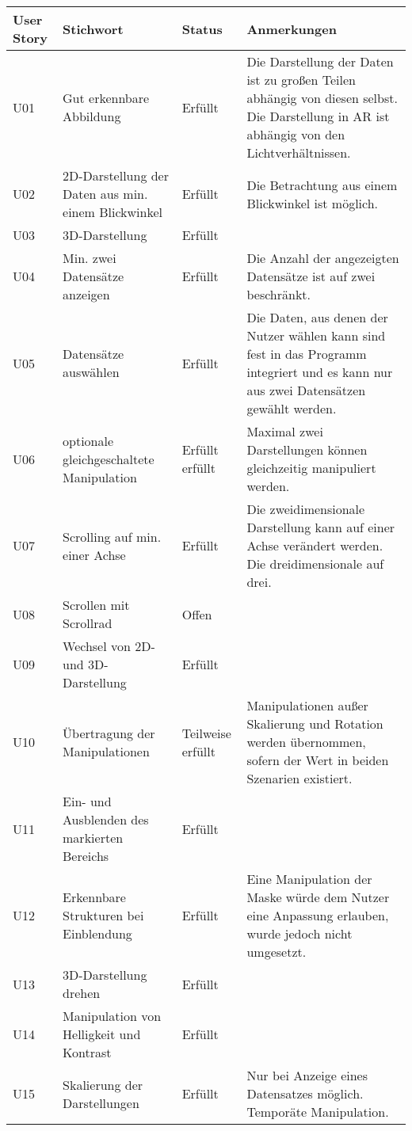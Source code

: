 \begin{longtable} {p{}p{}p{}p{}}
\toprule
User Story & Stichwort & Status & Anmerkungen \\
\toprule
U01 & Gut erkennbare Abbildung & Erfüllt & Die Darstellung der Daten ist zu großen Teilen abhängig von diesen selbst. Die Darstellung in AR ist abhängig von den Lichtverhältnissen.\\
\midrule 
U02 & 2D-Darstellung der Daten aus min. einem Blickwinkel & Erfüllt & Die Betrachtung aus einem Blickwinkel ist möglich.\\
\midrule 
U03 & 3D-Darstellung & Erfüllt & \\
\midrule 
U04 & Min. zwei Datensätze anzeigen & Erfüllt & Die Anzahl der angezeigten Datensätze ist auf zwei beschränkt.\\
\midrule 
U05 & Datensätze auswählen & Erfüllt & Die Daten, aus denen der Nutzer wählen kann sind fest in das Programm integriert und es kann nur aus zwei Datensätzen gewählt werden.\\
\midrule
U06 & optionale gleichgeschaltete Manipulation & Erfüllt erfüllt & Maximal zwei Darstellungen können gleichzeitig manipuliert werden. \\
\midrule 
U07 & Scrolling auf min. einer Achse & Erfüllt & Die zweidimensionale Darstellung kann auf einer Achse verändert werden. Die dreidimensionale auf drei.\\
\midrule 
U08 & Scrollen mit Scrollrad & Offen & \\
\midrule 
U09 & Wechsel von 2D- und 3D-Darstellung & Erfüllt & \\
\midrule 
U10 & Übertragung der Manipulationen & Teilweise erfüllt & Manipulationen außer Skalierung und Rotation werden übernommen, sofern der Wert in beiden Szenarien existiert.\\
\midrule 
U11  & Ein- und Ausblenden des markierten Bereichs & Erfüllt & \\
\midrule
U12 & Erkennbare Strukturen bei Einblendung & Erfüllt & Eine Manipulation der Maske würde dem Nutzer eine Anpassung erlauben, wurde jedoch nicht umgesetzt.\\
\midrule 
U13 & 3D-Darstellung drehen & Erfüllt & \\
\midrule 
U14 & Manipulation von Helligkeit und Kontrast & Erfüllt & \\
\midrule 
U15 & Skalierung der Darstellungen & Erfüllt & Nur bei Anzeige eines Datensatzes möglich. Temporäte Manipulation.\\

\end{longtable}
